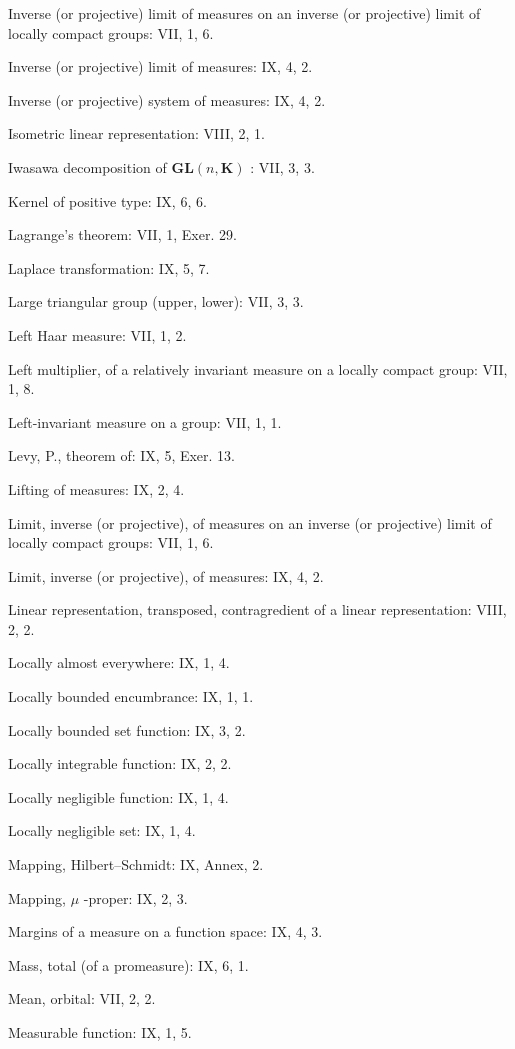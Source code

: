 Inverse (or projective) limit of measures on an inverse (or projective) limit of locally compact groups: VII, 1, 6.

Inverse (or projective) limit of measures: IX, 4, 2.

Inverse (or projective) system of measures: IX, 4, 2.

Isometric linear representation: VIII, 2, 1.

Iwasawa decomposition of \(\mathbf{GL}(n,\mathbf{K})\) : VII, 3, 3.

Kernel of positive type: IX, 6, 6.

Lagrange's theorem: VII, 1, Exer. 29.

Laplace transformation: IX, 5, 7.

Large triangular group (upper, lower): VII, 3, 3.

Left Haar measure: VII, 1, 2.

Left multiplier, of a relatively invariant measure on a locally compact group: VII, 1, 8.

Left-invariant measure on a group: VII, 1, 1.

Levy, P., theorem of: IX, 5, Exer. 13.

Lifting of measures: IX, 2, 4.

Limit, inverse (or projective), of measures on an inverse (or projective) limit of locally compact groups: VII, 1, 6.

Limit, inverse (or projective), of measures: IX, 4, 2.

Linear representation, transposed, contragredient of a linear representation: VIII, 2, 2.

Locally almost everywhere: IX, 1, 4.

Locally bounded encumbrance: IX, 1, 1.

Locally bounded set function: IX, 3, 2.

Locally integrable function: IX, 2, 2.

Locally negligible function: IX, 1, 4.

Locally negligible set: IX, 1, 4.

Mapping, Hilbert--Schmidt: IX, Annex, 2.

Mapping, \(\mu\) -proper: IX, 2, 3.

Margins of a measure on a function space: IX, 4, 3.

Mass, total (of a promeasure): IX, 6, 1.

Mean, orbital: VII, 2, 2.

Measurable function: IX, 1, 5.

